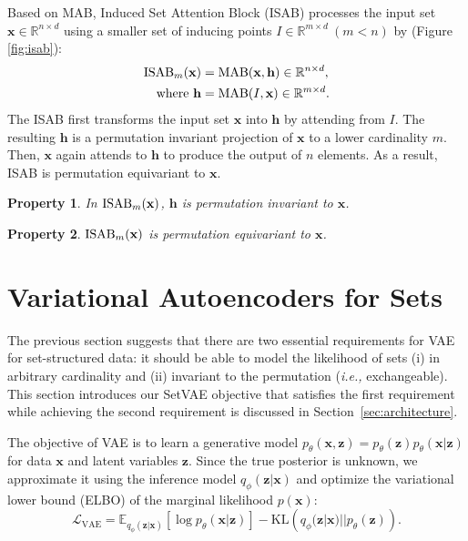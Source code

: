 \documentclass[final]{arxiv/cvpr}
\newtheorem{property}{Property}
\begin{document}
Based on MAB, Induced Set Attention Block (ISAB) processes the input set $\mathbf{x}\in\mathbb{R}^{n\times d}$ using a 
smaller set of inducing points $I\in \mathbb{R}^{m\times d}~(m<n)$ by (Figure \ref{fig:isab}):
\begin{align}
    \textnormal{ISAB}_m(\mathbf{x}) &= \textnormal{MAB}(\mathbf{x}, \mathbf{h}) \in \mathbb{R}^{n\times d}, \\
    \textnormal{where }\mathbf{h} &= \textnormal{MAB}(I, \mathbf{x}) \in \mathbb{R}^{m\times d}\label{eqn:isab_bottleneck}.
\end{align}
The ISAB first transforms the input set $\mathbf{x}$ into $\mathbf{h}$ by attending from $I$.
The resulting $\mathbf{h}$ is a permutation invariant projection of $\mathbf{x}$ to a lower cardinality $m$.
Then, $\mathbf{x}$ again attends to $\mathbf{h}$ to produce the output of $n$ elements.
As a result, ISAB is permutation equivariant to $\mathbf{x}$.

\begin{property}
In $\textnormal{ISAB}_m(\mathbf{x})$, $\mathbf{h}$ is permutation invariant to $\mathbf{x}$.
\end{property}
\begin{property}
\vspace{-0.2cm}
$\textnormal{ISAB}_m(\mathbf{x})$ is permutation equivariant to $\mathbf{x}$.
\end{property}
 \section{Variational Autoencoders for Sets}
\label{sec:method}
The previous section suggests that there are two essential requirements for VAE for set-structured data: it should be able to model the likelihood of sets (i) in arbitrary cardinality and (ii) invariant to the permutation (\emph{i.e.,} exchangeable). 
This section introduces our SetVAE objective that satisfies the first requirement while achieving the second requirement is discussed in Section~\ref{sec:architecture}.

The objective of VAE \cite{kingma2014autoencoding} is to learn a generative model $p_\theta(\mathbf{x}, \mathbf{z}) = p_\theta(\mathbf{z}) p_\theta(\mathbf{x}|\mathbf{z})$ for data $\mathbf{x}$ and latent variables $\mathbf{z}$. 
Since the true posterior is unknown, we approximate it using the inference model $q_\phi(\mathbf{z}|\mathbf{x})$ and optimize the variational lower bound (ELBO) of the marginal likelihood $p(\mathbf{x})$:
\begin{equation}
    \mathcal{L}_{\text{VAE}} = \mathbb{E}_{q_\phi(\mathbf{z}|\mathbf{x})}{\left[\log p_\theta(\mathbf{x}|\mathbf{z})\right]}  - \text{KL}\left(q_\phi(\mathbf{z}|\mathbf{x})||p_\theta(\mathbf{z})\right).
    \label{eqn:original_vae}
\end{equation}
\end{document}
